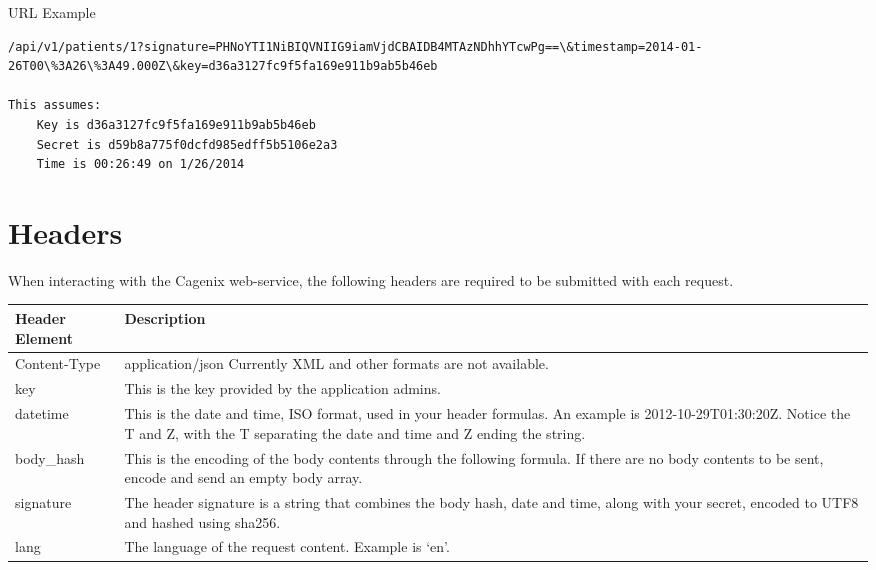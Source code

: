 \documentclass[letterpaper,10pt,english]{sphinxmanual}
\begin{document}
URL Example

\begin{Verbatim}[commandchars=\\\{\}]
/api/v1/patients/1?signature=PHNoYTI1NiBIQVNIIG9iamVjdCBAIDB4MTAzNDhhYTcwPg==\&timestamp=2014-01-26T00\%3A26\%3A49.000Z\&key=d36a3127fc9f5fa169e911b9ab5b46eb

This assumes:
    Key is d36a3127fc9f5fa169e911b9ab5b46eb
    Secret is d59b8a775f0dcfd985edff5b5106e2a3
    Time is 00:26:49 on 1/26/2014
\end{Verbatim}


\section{Headers}
\label{dev-api-overview:headers}
When interacting with the Cagenix web-service, the following headers are
required to be submitted with each request.

\begin{tabulary}{\linewidth}{|L|L|}
\hline
\textsf{\relax 
Header Element
} & \textsf{\relax 
Description
}\\
\hline
Content-Type
 & 
application/json
Currently XML and other formats are not available.
\\

key
 & 
This is the key provided by the application admins.
\\

datetime
 & 
This is the date and time, ISO format, used in your
header formulas. An example is 2012-10-29T01:30:20Z.
Notice the T and Z, with the T separating the date and
time and Z ending the string.
\\

body\_hash
 & 
This is the encoding of the body contents through the
following formula. If there are no body contents to be
sent, encode and send an empty body array.
\\

signature
 & 
The header signature is a string that combines the body
hash, date and time, along with your secret, encoded to
UTF8 and hashed using sha256.
\\

lang
 & 
The language of the request content. Example is `en'.
\\
\hline\end{tabulary}
\end{document}
